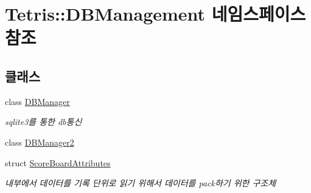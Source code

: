 \hypertarget{namespace_tetris_1_1_d_b_management}{}\section{Tetris\+:\+:D\+B\+Management 네임스페이스 참조}
\label{namespace_tetris_1_1_d_b_management}
\subsection*{클래스}
\begin{DoxyCompactItemize}
\item 
class \hyperlink{class_tetris_1_1_d_b_management_1_1_d_b_manager}{D\+B\+Manager}
\begin{DoxyCompactList}\small\item\em sqlite3를 통한 db통신 \end{DoxyCompactList}\item 
class \hyperlink{class_tetris_1_1_d_b_management_1_1_d_b_manager2}{D\+B\+Manager2}
\item 
struct \hyperlink{struct_tetris_1_1_d_b_management_1_1_score_board_attributes}{Score\+Board\+Attributes}
\begin{DoxyCompactList}\small\item\em 내부에서 데이터를 기록 단위로 읽기 위해서 데이터를 pack하기 위한 구조체 \end{DoxyCompactList}\end{DoxyCompactItemize}
